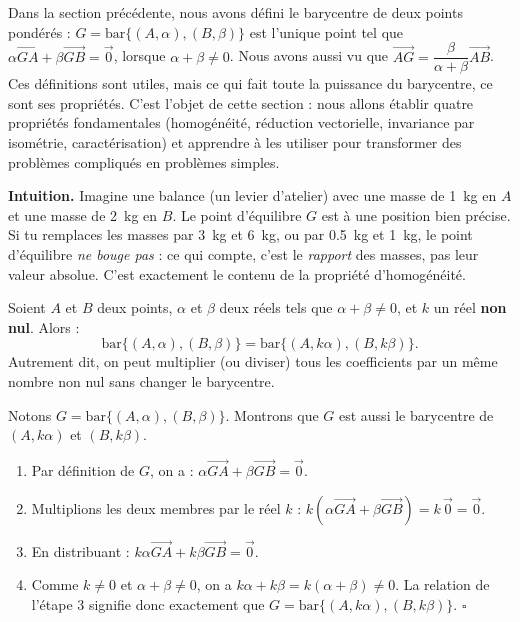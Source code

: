 \documentclass[11pt]{article}
\newcommand{\cle}[1]{{\popxbold\color{popdark}#1}}
\newcounter{popsec}
\newcounter{popsub}
\newcommand{\courssub}[1]{%
  \stepcounter{popsub}%
  \par\vspace{9pt}\noindent{\popxbold\fontsize{11.5}{13}\selectfont\color{popink}{\color{poporange}\thepopsec.\thepopsub}\hspace{6pt}#1}\par\nopagebreak\vspace{4pt}
}
\begin{document}
Dans la section précédente, nous avons défini le barycentre de deux points pondérés : $G = \text{bar}\{(A,\alpha),(B,\beta)\}$ est l'unique point tel que $\alpha\overrightarrow{GA}+\beta\overrightarrow{GB}=\vec{0}$, lorsque $\alpha+\beta\neq 0$. Nous avons aussi vu que $\overrightarrow{AG}=\dfrac{\beta}{\alpha+\beta}\overrightarrow{AB}$. Ces définitions sont utiles, mais ce qui fait toute la puissance du barycentre, ce sont ses \cle{propriétés}. C'est l'objet de cette section : nous allons établir quatre propriétés fondamentales (homogénéité, réduction vectorielle, invariance par isométrie, caractérisation) et apprendre à les utiliser pour transformer des problèmes compliqués en problèmes simples.

\courssub{Homogénéité du barycentre}

\textbf{Intuition.} Imagine une balance (un levier d'atelier) avec une masse de \SI{1}{kg} en $A$ et une masse de \SI{2}{kg} en $B$. Le point d'équilibre $G$ est à une position bien précise. Si tu remplaces les masses par \SI{3}{kg} et \SI{6}{kg}, ou par \SI{0,5}{kg} et \SI{1}{kg}, le point d'équilibre \emph{ne bouge pas} : ce qui compte, c'est le \emph{rapport} des masses, pas leur valeur absolue. C'est exactement le contenu de la propriété d'homogénéité.

\begin{propriete}
Soient $A$ et $B$ deux points, $\alpha$ et $\beta$ deux réels tels que $\alpha+\beta\neq 0$, et $k$ un réel \textbf{non nul}. Alors :
\[
\text{bar}\{(A,\alpha),(B,\beta)\}=\text{bar}\{(A,k\alpha),(B,k\beta)\}.
\]
Autrement dit, on peut multiplier (ou diviser) tous les coefficients par un même nombre non nul sans changer le barycentre.
\end{propriete}

\begin{experience}
Notons $G=\text{bar}\{(A,\alpha),(B,\beta)\}$. Montrons que $G$ est aussi le barycentre de $(A,k\alpha)$ et $(B,k\beta)$.
\begin{enumerate}
\item Par définition de $G$, on a : $\alpha\overrightarrow{GA}+\beta\overrightarrow{GB}=\vec{0}$.
\item Multiplions les deux membres par le réel $k$ : $k\left(\alpha\overrightarrow{GA}+\beta\overrightarrow{GB}\right)=k\,\vec{0}=\vec{0}$.
\item En distribuant : $k\alpha\overrightarrow{GA}+k\beta\overrightarrow{GB}=\vec{0}$.
\item Comme $k\neq 0$ et $\alpha+\beta\neq 0$, on a $k\alpha+k\beta=k(\alpha+\beta)\neq 0$. La relation de l'étape 3 signifie donc exactement que $G=\text{bar}\{(A,k\alpha),(B,k\beta)\}$. \hfill$\square$
\end{enumerate}
\end{experience}
\end{document}
